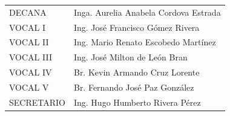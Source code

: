 \documentclass[12pt,spanish,Letterpaper,openany]{book}
\begin{document}
\begin{longtable}[]{@{}ll@{}}
\endhead
\begin{minipage}[t]{0.239\columnwidth}\raggedright
DECANA\strut
\end{minipage} & \begin{minipage}[t]{0.35\columnwidth}\raggedright
Inga. Aurelia Anabela Cordova Estrada\strut
\end{minipage}\tabularnewline
\begin{minipage}[t]{0.239\columnwidth}\raggedright
VOCAL I\strut
\end{minipage} & \begin{minipage}[t]{0.35\columnwidth}\raggedright
Ing. José Francisco Gómez Rivera\strut
\end{minipage}\tabularnewline
\begin{minipage}[t]{0.239\columnwidth}\raggedright
VOCAL II\strut
\end{minipage} & \begin{minipage}[t]{0.35\columnwidth}\raggedright
Ing. Mario Renato Escobedo Martínez\strut
\end{minipage}\tabularnewline
\begin{minipage}[t]{0.239\columnwidth}\raggedright
VOCAL III\strut
\end{minipage} & \begin{minipage}[t]{0.35\columnwidth}\raggedright
Ing. José Milton de León Bran\strut
\end{minipage}\tabularnewline
\begin{minipage}[t]{0.239\columnwidth}\raggedright
VOCAL IV\strut
\end{minipage} & \begin{minipage}[t]{0.35\columnwidth}\raggedright
Br. Kevin Armando Cruz Lorente\strut
\end{minipage}\tabularnewline
\begin{minipage}[t]{0.239\columnwidth}\raggedright
VOCAL V\strut
\end{minipage} & \begin{minipage}[t]{0.35\columnwidth}\raggedright
Br. Fernando José Paz González\strut
\end{minipage}\tabularnewline
\begin{minipage}[t]{0.239\columnwidth}\raggedright
SECRETARIO\strut
\end{minipage} & \begin{minipage}[t]{0.35\columnwidth}\raggedright
Ing. Hugo Humberto Rivera Pérez\strut
\end{minipage}\tabularnewline
\end{longtable}
\end{document}

